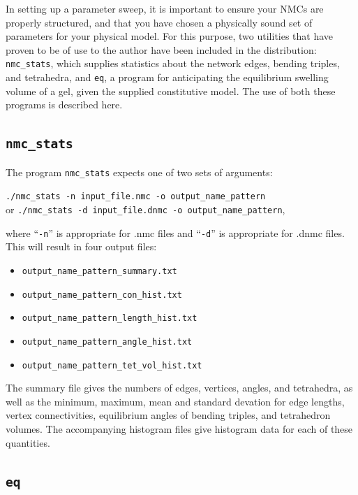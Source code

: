 \documentclass{article}
\begin{document}
In setting up a parameter sweep, it is important to ensure your NMCs are
properly structured, and that you have chosen a physically sound set of
parameters for your physical model. For this purpose, two utilities that have
proven to be of use to the author have been included in the distribution:
\texttt{nmc\_stats}, which supplies statistics about the network edges, bending
triples, and tetrahedra, and \texttt{eq}, a program for anticipating the
equilibrium swelling volume of a gel, given the supplied constitutive model.
The use of both these programs is described here.

\subsection{\texttt{nmc\_stats}}

The program \texttt{nmc\_stats} expects one of two sets of arguments:
\begin{center}
\texttt{./nmc\_stats -n input\_file.nmc -o output\_name\_pattern}
\\or
\texttt{./nmc\_stats -d input\_file.dnmc -o output\_name\_pattern},
\end{center}
where ``\texttt{-n}'' is appropriate for .nmc files and ``\texttt{-d}'' is
appropriate for .dnmc files. This will result in four output files:

\begin{itemize}
\item \texttt{output\_name\_pattern\_summary.txt}
\item \texttt{output\_name\_pattern\_con\_hist.txt}
\item \texttt{output\_name\_pattern\_length\_hist.txt}
\item \texttt{output\_name\_pattern\_angle\_hist.txt}
\item \texttt{output\_name\_pattern\_tet\_vol\_hist.txt}
\end{itemize}

The summary file gives the numbers of edges, vertices, angles, and tetrahedra,
as well as the minimum, maximum, mean and standard devation for edge lengths,
vertex connectivities, equilibrium angles of bending triples, and tetrahedron
volumes. The accompanying histogram files give histogram data for each of these
quantities.

\subsection{\texttt{eq}}
\end{document}
